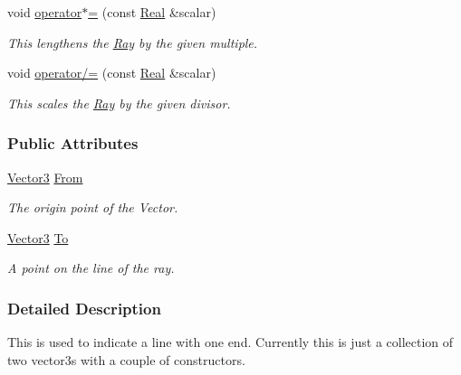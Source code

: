 \begin{DoxyCompactItemize}
void \hyperlink{classphys_1_1Ray_acc1ac010f02f61b3d5234a5b619e926a}{operator$\ast$=} (const \hyperlink{namespacephys_af7eb897198d265b8e868f45240230d5f}{Real} \&scalar)
\begin{DoxyCompactList}\small\item\em This lengthens the \hyperlink{classphys_1_1Ray}{Ray} by the given multiple. \item\end{DoxyCompactList}\item 
void \hyperlink{classphys_1_1Ray_a11f681152a5a39c36f2b398d44657ecd}{operator/=} (const \hyperlink{namespacephys_af7eb897198d265b8e868f45240230d5f}{Real} \&scalar)
\begin{DoxyCompactList}\small\item\em This scales the \hyperlink{classphys_1_1Ray}{Ray} by the given divisor. \item\end{DoxyCompactList}\end{DoxyCompactItemize}
\subsubsection*{Public Attributes}
\begin{DoxyCompactItemize}
\item 
\hypertarget{classphys_1_1Ray_a3004d52f8f1e317ee602f8f278531057}{
\hyperlink{classphys_1_1Vector3}{Vector3} \hyperlink{classphys_1_1Ray_a3004d52f8f1e317ee602f8f278531057}{From}}
\label{df/d57/classphys_1_1Ray_a3004d52f8f1e317ee602f8f278531057}

\begin{DoxyCompactList}\small\item\em The origin point of the Vector. \item\end{DoxyCompactList}\item 
\hypertarget{classphys_1_1Ray_aa2585a1c6d29d1533c816e7277baf1ad}{
\hyperlink{classphys_1_1Vector3}{Vector3} \hyperlink{classphys_1_1Ray_aa2585a1c6d29d1533c816e7277baf1ad}{To}}
\label{df/d57/classphys_1_1Ray_aa2585a1c6d29d1533c816e7277baf1ad}

\begin{DoxyCompactList}\small\item\em A point on the line of the ray. \item\end{DoxyCompactList}\end{DoxyCompactItemize}


\subsubsection{Detailed Description}
This is used to indicate a line with one end. Currently this is just a collection of two vector3s with a couple of constructors. 

